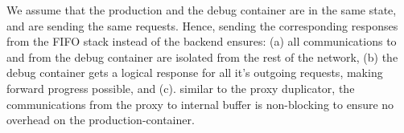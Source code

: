 We assume that the production and the debug container are in the same state, and are sending the same requests. 
Hence, sending the corresponding responses from the FIFO stack instead of the backend ensures:
(a) all communications to and from the debug container are isolated from the rest of the network,
(b) the debug container gets a logical response for all it's outgoing requests, making forward progress possible,
and (c). similar to the proxy duplicator, the communications from the proxy to internal buffer is non-blocking to ensure no overhead on the production-container.


